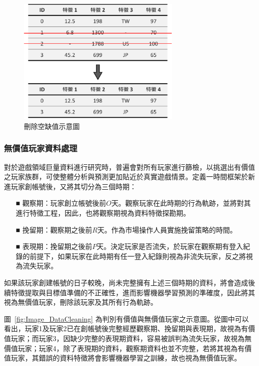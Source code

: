 \begin{figure}[!htb]
  \begin{center}
    \includegraphics[width=0.7\textwidth]{figures/Image_MissingValueHandle.png}
    \caption[刪除空缺值示意圖]{刪除空缺值示意圖}
    \label{fig:Image_MissingValueHandle}
  \end{center}
\end{figure}

\subsubsection{無價值玩家資料處理}
\label{subsubsec:NonValuePlayerHandle}

對於遊戲領域巨量資料進行研究時，普遍會對所有玩家進行篩檢，以挑選出有價值之玩家族群，可使整體分析與預測更加貼近於真實遊戲情景。定義一時間框架於新進玩家創帳號後，又將其切分為三個時期：

\begin{itemize}
  \item [■] 觀察期：玩家創立帳號後前$O$天。觀察玩家在此時期的行為軌跡，並將對其進行特徵工程，因此，也將觀察期視為資料特徵探勘期。
  \item [■] 挽留期：觀察期之後前$R$天。作為市場操作人員實施挽留策略的時間。
  \item [■] 表現期：挽留期之後前$P$天。決定玩家是否流失，於玩家在觀察期有登入紀錄的前提下，如果玩家在此時期有任一登入紀錄則視為非流失玩家，反之將視為流失玩家。
\end{itemize}

如果該玩家創建帳號的日子較晚，尚未完整擁有上述三個時期的資料，將會造成後續特徵提取與目標值準備的不正確性，進而影響機器學習預測的準確度，因此將其視為無價值玩家，刪除該玩家及其所有行為軌跡。

圖~\ref{fig:Image_DataCleaning} 為判別有價值與無價值玩家之示意圖。從圖中可以看出，玩家1及玩家2已在創帳號後完整經歷觀察期、挽留期與表現期，故視為有價值玩家；而玩家3，因缺少完整的表現期資料，容易被誤判為流失玩家，故視為無價值玩家；玩家4，除了表現期的資料，觀察期資料也並不完整，若將其視為有價值玩家，其錯誤的資料特徵將會影響機器學習之訓練，故也視為無價值玩家。

